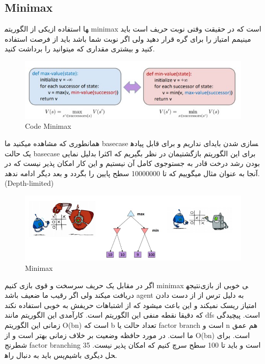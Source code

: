 \subsection{Minimax}
یکی از الگوریتم‎ها استفاده از minimax است که در حقیقت وقتی نوبت حریف است باید مینیمم امتیاز را برای گره قرار دهید ولی اگر نوبت شما باشد باید از فرصت استفاده کنید و بیشتری مقداری که میتوانید را برداشت کنید.


\begin{figure}[h!]
    \centering
    \includegraphics[width=0.8\linewidth]{images/minimax02.jpg}
    \caption{Code Minimax}
\end{figure}

همانطوری که مشاهده میکنید ما basecase ای نداریم و برای قابل پیاده‎سازی شدن باید یک حالت basecase برای این الگوریتم بازگشتیمان در نظر بگیریم که اکثرا بدلیل نمایی بودن رشد درخت قادر به جستوجوی کامل آن نیستیم و این کار امکان پذیر نیست که در آنجا به عنوان مثال میگوییم که تا 10000000 سطح پایین را بگردد و بعد دیگر ادامه ندهد.(Depth-limited)

\begin{figure}[h!]
    \centering
    \includegraphics[width=0.8\linewidth]{images/minimax03.jpg}
    \caption{Minimax}
\end{figure}

اگر در مقابل یک حریف سرسخت و قوی بازی کنیم minimax نتیجه‎ی خوبی از بازی دریافت میکند ولی اگر رقیب ما ضعیف باشد agent به دلیل ترس از از دست دادن امتیاز ریسک نمیکند و این باعث میشود که از اشتباهات حریفش به خوبی استفاده نکند که دقیقا نقطه منفی این الگوریتم است.
کارآمدی این الگوریتم مانند dfs است. پیچیدگی زمانی این الگوریتم O(bn) است که b تعداد حالت یا factor branch است  و n هم عمق ما است. در مورد حافظه وضعیت بر خلاف زمانی بهتر است  و از O(bn) است. برای شطرنج factor branching 35 است و باید تا 100 سطح سرچ کنیم که امکان پذیر نیست. پس باید به دنبال راه‎حل دیگری باشیم.



